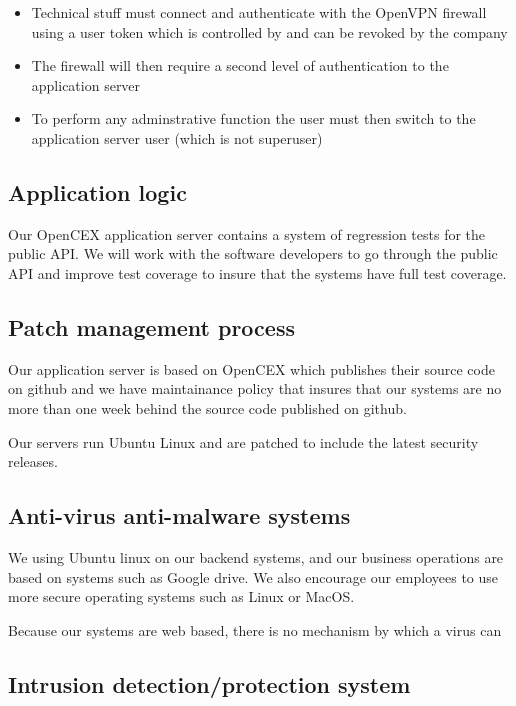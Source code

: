 \begin{itemize}
\item Technical stuff must connect and authenticate with the OpenVPN
firewall using a user token which is controlled by and can be revoked
by the company
\item The firewall will then require a second level of authentication to
the application server
\item To perform any adminstrative function the user must then switch
  to the application server user (which is not superuser)
\end{itemize}


\subsection{Application logic}
Our OpenCEX application server contains a system of regression tests for the
public API.  We will work with the software developers to go through
the public API and improve test coverage to insure that the systems
have full test coverage.

\subsection{Patch management process}

Our application server is based on OpenCEX which publishes their
source code on github and we have maintainance policy that insures
that our systems are no more than one week behind the source code
published on github.

Our servers run Ubuntu Linux and are patched to include the latest
security releases.

\subsection{Anti-virus anti-malware systems}

We using Ubuntu linux on our backend systems, and our business
operations are based on systems such as Google drive.  We also
encourage our employees to use more secure operating systems such as
Linux or MacOS.

Because our systems are web based, there is no mechanism by which a
virus can 

\subsection{Intrusion detection/protection system}


